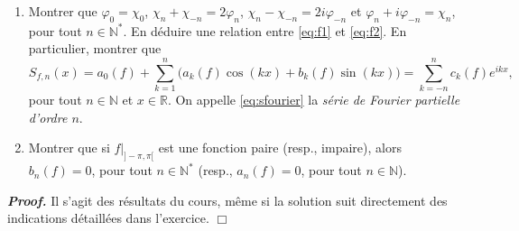 \documentclass[11pt,a4paper]{article}
\newcommand{\NN}{\mathbb{N}}
\newcommand{\RR}{\mathbb{R}}
\newenvironment{preuve}[1][]
{\vskip 2mm  \noindent\emph{\bf Proof#1. }}{$\Box$ \vskip 2mm}
\newcounter{exercice}
\begin{document}
\begin{enumerate}
		\item Montrer que $\varphi_{0} = \chi_{0}$, 
		$\chi_{n} + \chi_{-n} = 2 \varphi_{n}$, $\chi_{n} - \chi_{-n} = 2 i \varphi_{-n}$ et $\varphi_{n} + i \varphi_{-n} = \chi_{n}$, 
		pour tout $n \in \NN^{*}$. 
		En déduire une relation entre \eqref{eq:f1} et \eqref{eq:f2}.          
		En particulier, montrer que 
		\begin{equation}
		\label{eq:sfourier}
		\tag{F}
		S_{f,n}(x) = a_{0}(f) + \sum_{k=1}^{n} \big(a_{k}(f) \cos(k x) + b_{k}(f) \sin(k x) \big) = \sum_{k=-n}^{n} c_{k}(f) e^{i k x},   
		\end{equation}
		pour tout $n \in \NN$ et $x \in \RR$. 
		On appelle \eqref{eq:sfourier} la \emph{série de Fourier partielle d'ordre $n$}. 
		
		\item Montrer que si $f|_{]-\pi,\pi [}$ est une fonction paire (resp., impaire), alors $b_{n}(f) = 0$, pour tout $n \in \NN^{*}$ (resp., 
		$a_{n}(f) = 0$, pour tout $n \in \NN$).
	\end{enumerate}                          
	
	\begin{preuve}
		Il s'agit des résultats du cours, même si la solution suit directement des indications détaillées dans l'exercice. 
	\end{preuve}
	
\end{document}

